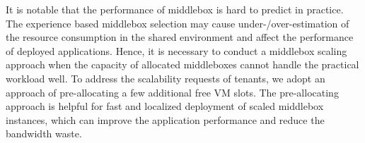 \documentclass[review]{elsarticle}
\begin{document}
It is notable that the performance of middlebox is hard to predict in practice. The experience based middlebox selection may cause under-/over-estimation of the resource consumption in the shared environment and affect the performance of deployed applications. %
Hence, 
it is necessary to conduct a middlebox scaling approach %
when the capacity of allocated middleboxes cannot handle the practical workload well. 
To address the scalability requests of tenants,
we adopt an approach of pre-allocating a few additional free VM slots. %
The pre-allocating approach is helpful for fast and localized deployment of scaled middlebox instances, which 
can improve the application performance and reduce the bandwidth waste.  %



\end{document}
